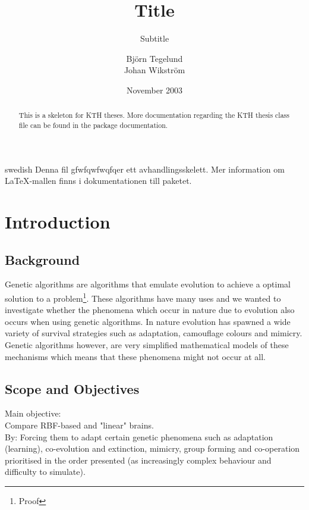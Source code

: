 \documentclass[a4paper,11pt]{kth-mag}
\title{Title}
\subtitle{Subtitle}
\author{Björn Tegelund\\Johan Wikström}
\date{November 2003}
\begin{document}
\frontmatter
\pagestyle{empty}
\removepagenumbers
\maketitle
{}
\begin{abstract}
  This is a skeleton for KTH theses. More documentation
  regarding the KTH thesis class file can be found in
  the package documentation.

\end{abstract}
\clearpage
\begin{foreignabstract}{swedish}
  Denna fil gfwfqwfwqfqer ett avhandlingsskelett.
  Mer information om \LaTeX-mallen finns i
  dokumentationen till paketet.

\end{foreignabstract}
\clearpage
\tableofcontents*
\mainmatter
\pagestyle{newchap}
\chapter{Introduction}

\section{Background}

Genetic algorithms are algorithms that emulate evolution to achieve a optimal solution to a problem\footnote[1]{Proof}. 
These algorithms have many uses and we wanted to investigate whether the phenomena which occur in nature
due to evolution also occurs when using genetic algorithms. In nature evolution has spawned a wide variety
of survival strategies such as adaptation, camouflage colours and mimicry. Genetic algorithms however, are 
very simplified mathematical models of these mechanisms which means that these phenomena might not occur 
at all.

\section{Scope and Objectives}

Main objective:\\
Compare RBF-based and "linear" brains.\\
By: Forcing them to adapt certain genetic phenomena such as adaptation (learning), co-evolution and extinction, mimicry, group forming and co-operation prioritised in the order presented (as increasingly complex behaviour and difficulty to simulate).\\
\end{document}
